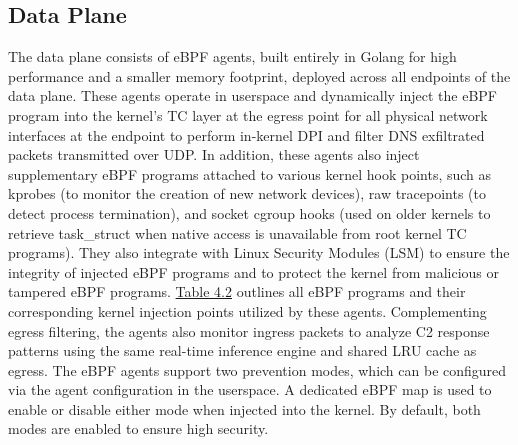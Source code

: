 \documentclass [11pt, proquest] {uwthesis}[2020/02/24]
\begin{document}
\subsection{Data Plane}
The data plane consists of eBPF agents, built entirely in Golang for high performance and a smaller memory footprint, deployed across all endpoints of the data plane. These agents operate in userspace and dynamically inject the eBPF program into the kernel’s TC layer at the egress point for all physical network interfaces at the endpoint to perform in-kernel DPI and filter DNS exfiltrated packets transmitted over UDP. In addition, these agents also inject supplementary eBPF programs attached to various kernel hook points, such as kprobes (to monitor the creation of new network devices), raw tracepoints (to detect process termination), and socket cgroup hooks (used on older kernels to retrieve task\_struct when native access is unavailable from root kernel TC programs). They also integrate with Linux Security Modules (LSM) to ensure the integrity of injected eBPF programs and to protect the kernel from malicious or tampered eBPF programs. \hyperref[sec:dp_kernel_prog_ty]{Table 4.2} outlines all eBPF programs and their corresponding kernel injection points utilized by these agents. Complementing egress filtering, the agents also monitor ingress packets to analyze C2 response patterns using the same real-time inference engine and shared LRU cache as egress.
The eBPF agents support two prevention modes, which can be configured via the agent configuration in the userspace. A dedicated eBPF map is used to enable or disable either mode when injected into the kernel. By default, both modes are enabled to ensure high security.
\end{document}
